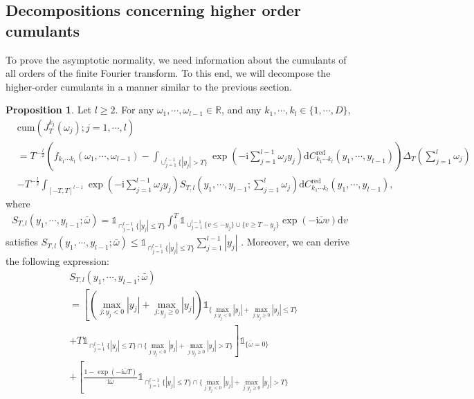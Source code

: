 \documentclass[11pt]{article}
\numberwithin{equation}{section}
\theoremstyle{plain}
\theoremstyle{definition}
\theoremstyle{definition}
\theoremstyle{assumption}
\theoremstyle{proposition}
\newtheorem{proposition}{Proposition}[section]
\theoremstyle{proposition}
\theoremstyle{example}
\theoremstyle{lemma}
\theoremstyle{theorem}
\theoremstyle{remark}
\begin{document}
\subsection{Decompositions concerning higher order cumulants}
To prove the asymptotic normality, we need information about the cumulants of all orders of the finite Fourier transform. To this end, we will decompose the higher-order cumulants in a manner similar to the previous section.
\begin{proposition}\label{cum_J_prop}
Let $l\geqslant2$. For any $\omega_1,\cdots,\omega_{l-1}\in\mathbb{R}$, and any $k_1,\cdots,k_l\in\{1,\cdots,D\}$,
\begin{align*}
&\mathrm{cum}(J_T^{k_j}(\omega_j);j=1,\cdots,l) \\
&=T^{-\frac{l}{2}}\left(f_{k_1 \cdots k_l}(\omega_1,\cdots,\omega_{l-1}) -\int_{\cup_{j=1}^{l-1}\{|y_j|>T\}}\exp\left(-\mathrm{i}\sum_{j=1}^{l-1}\omega_j y_j\right) \mathrm{d}C_{k_1\cdots k_l}^{\mathrm{red}}(y_1, \cdots, y_{l-1}) \right)\Delta_T\left(\sum_{j=1}^l\omega_j\right) \\
&- T^{-\frac{l}{2}}\int_{[-T,T]^{l-1}} \exp\left(-\mathrm{i}\sum_{j=1}^{l-1}\omega_j y_j\right) S_{T,l}(y_1,\cdots,y_{l-1};\sum_{j=1}^l\omega_j)\mathrm{d}C_{k_1\cdots k_l}^{\mathrm{red}}(y_1, \cdots, y_{l-1}), 
\end{align*}
where 
\begin{align*}
S_{T,l}(y_1,\cdots,y_{l-1};\bar{\omega}) = \mathds{1}_{\cap_{j=1}^{l-1} \{|y_j| \leqslant T\}}\int_0^T \mathds{1}_{\cup_{j=1}^{l-1} \{v \leqslant -y_j\}\cup\{v \geqslant T - y_j\}}  \exp\left(-\mathrm{i}\bar{\omega}v \right)\mathrm{d}v 
\end{align*}
satisfies $S_{T,l}(y_1,\cdots,y_{l-1};\bar{\omega})\leqslant\mathds{1}_{\cap_{j=1}^{l-1} \{|y_j| \leqslant T\}}\sum_{j=1}^{l-1} |y_j|$ . Moreover, we can derive the following expression:
\begin{align*}
&S_{T,l}(y_1,\cdots,y_{l-1};\bar{\omega}) \\
& = \left[\left(\max_{j:y_j<0}|y_j| + \max_{j:y_j\geqslant0}|y_j|\right)\mathds{1}_{\{\max_{j:y_j<0}|y_j| + \max_{j:y_j\geqslant0}|y_j|\leqslant T\}} \right. \\
& \left. + T\mathds{1}_{\cap_{j=1}^{l-1} \{|y_j| \leqslant T\}\cap\{\max_{j:y_j<0}|y_j| + \max_{j:y_j\geqslant0}|y_j|> T\}}\right]\mathds{1}_{\{\bar{\omega} = 0\}} \\
& + \left[\frac{1 - \exp(-\mathrm{i}\bar{\omega}T) }{\mathrm{i}\bar{\omega}}\mathds{1}_{\cap_{j=1}^{l-1} \{|y_j| \leqslant T\}\cap\{\max_{j:y_j<0}|y_j| + \max_{j:y_j\geqslant0}|y_j|> T\}} \right. \\

\end{align*}
\end{proposition}
\end{document}
